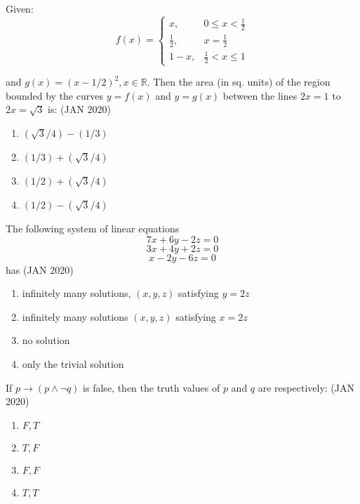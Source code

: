     \item Given:
        \[f(x)=\begin{cases}
        x, & 0 \leq x < \frac{1}{2} \\
        \frac{1}{2}, & x = \frac{1}{2} \\
        1-x, & \frac{1}{2} < x \leq 1
        \end{cases}\]
        
        and $g(x) = (x-1/2)^{2}, x \in \mathbb{R}$. Then the area (in sq. units) of the region bounded by the curves $y = f(x)$ and $y = g(x)$ between the lines $2x=1$ to $2x=\sqrt{3}$ is: \hfill{(JAN 2020)}
        
        \begin{enumerate}
        \item $(\sqrt{3}/4)-(1/3)$
        \item $(1/3)+(\sqrt{3}/4)$
        \item $(1/2)+(\sqrt{3}/4)$
        \item $(1/2)-(\sqrt{3}/4)$
        \end{enumerate}

    \item The following system of linear equations
        \[7x+6y-2z=0\] 
        \[3x+4y+2z=0\]
        \[x-2y-6z=0\]
        has \hfill{(JAN 2020)}
        \begin{enumerate}
        \item infinitely many solutions, $(x,y,z)$ satisfying $y=2z$
        \item infinitely many solutions $(x,y,z)$ satisfying $x=2z$
        \item no solution
        \item only the trivial solution
        \end{enumerate}

    \item If \( p \to (p \land \neg q) \) is false, then the truth values of \( p \) and \( q \) are respectively: \hfill{(JAN 2020)}
        \begin{multicols}{4}
        \begin{enumerate}
            \item \( F, T \)  
            \item \( T, F \)  
            \item \( F, F \)  
            \item \( T, T \)
        \end{enumerate}
        \end{multicols}

